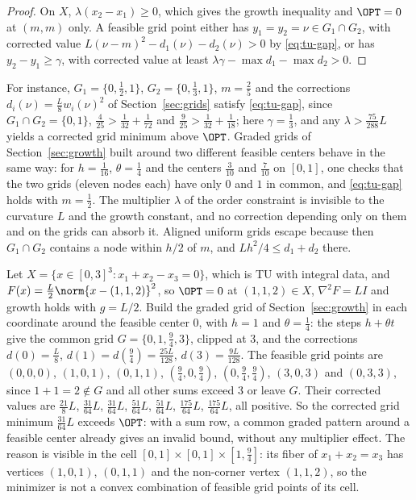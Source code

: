 \begin{proof}
On $X$, $\lambda(x_2-x_1)\ge0$, which gives the growth inequality and
$\OPT=0$ at $(m,m)$ only. A feasible grid point either has $y_1=y_2=\nu\in
G_1\cap G_2$, with corrected value $L(\nu-m)^2-d_1(\nu)-d_2(\nu)>0$ by
\eqref{eq:tu-gap}, or has $y_2-y_1\ge\gamma$, with corrected value at least
$\lambda\gamma-\max d_1-\max d_2>0$.
\end{proof}

For instance, $G_1=\{0,\frac12,1\}$, $G_2=\{0,\frac13,1\}$, $m=\frac25$ and the
corrections $d_i(\nu)=\frac L8w_i(\nu)^2$ of Section~\ref{sec:grids} satisfy
\eqref{eq:tu-gap}, since $G_1\cap G_2=\{0,1\}$,
$\frac4{25}>\frac1{32}+\frac1{72}$ and $\frac9{25}>\frac1{32}+\frac1{18}$; here
$\gamma=\frac13$, and any $\lambda>\frac{75}{288}L$ yields a corrected grid minimum
above $\OPT$. Graded grids of Section~\ref{sec:growth} built around two
different feasible centers behave in the same way: for $h=\frac1{16}$,
$\theta=\frac14$ and the centers $\frac3{10}$ and $\frac7{10}$ on $[0,1]$, one
checks that the two grids (eleven nodes each) have only $0$ and $1$ in common,
and \eqref{eq:tu-gap} holds with $m=\frac12$. The
multiplier $\lambda$ of the order constraint is invisible to the curvature
$L$ and the growth constant, and no correction depending only on them and on
the grids can absorb it. Aligned uniform grids escape because then
$G_1\cap G_2$ contains a node within $h/2$ of $m$, and
$Lh^2/4\le d_1+d_2$ there.

\begin{example}\label{ex:tu-sum}
Let $X=\{x\in[0,3]^3:x_1+x_2-x_3=0\}$, which is TU with integral data, and
$F(x)=\frac L2\norm{x-(1,1,2)}^2$, so $\OPT=0$ at $(1,1,2)\in X$,
$\nabla^2F=LI$ and growth holds with $g=L/2$. Build the graded grid of
Section~\ref{sec:growth} in each coordinate around the feasible center $0$,
with $h=1$ and $\theta=\frac14$: the steps $h+\theta t$ give the common grid
$G=\{0,1,\frac94,3\}$, clipped at $3$, and the corrections
$d(0)=\frac L8$, $d(1)=d(\frac94)=\frac{25L}{128}$, $d(3)=\frac{9L}{128}$. The feasible
grid points are
$(0,0,0)$, $(1,0,1)$, $(0,1,1)$, $(\frac94,0,\frac94)$, $(0,\frac94,\frac94)$,
$(3,0,3)$ and $(0,3,3)$, since $1+1=2\notin G$ and all other sums exceed $3$ or
leave $G$. Their corrected values are
$\frac{21}8L$, $\frac{31}{64}L$, $\frac{31}{64}L$, $\frac{51}{64}L$, $\frac{51}{64}L$,
$\frac{175}{64}L$, $\frac{175}{64}L$, all positive. So the corrected grid minimum
$\frac{31}{64}L$ exceeds $\OPT$: with a sum row, a common graded pattern around a
feasible center already gives an invalid bound, without any multiplier
effect. The reason is visible in the cell $[0,1]\times[0,1]\times[1,\frac94]$:
its fiber of $x_1+x_2=x_3$ has vertices $(1,0,1)$, $(0,1,1)$ and the
non-corner vertex $(1,1,2)$, so the minimizer is not a convex combination of
feasible grid points of its cell.
\end{example}

